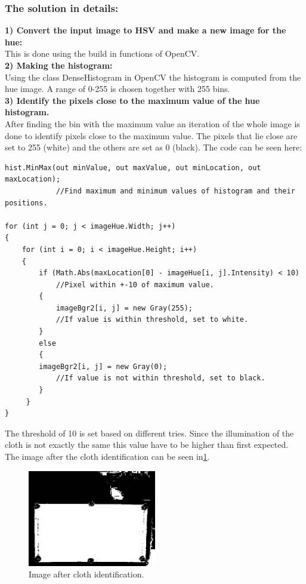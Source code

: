 \subsubsection{The solution in details:}
\textbf{1) Convert the input image to HSV and make a new image for the hue:}\\
This is done using the build in functions of OpenCV\cite{opencv}.\\

\textbf{2) Making the histogram:}\\
Using the class DenseHistogram in OpenCV\cite{opencv} the histogram is computed from the hue image. A range of 0-255 is chosen together with 255 bins.\\

\textbf{3) Identify the pixels close to the maximum value of the hue histogram.}\\
After finding the bin with the maximum value an iteration of the whole image is done to identify pixels close to the maximum value. The pixels that lie close are set to 255 (white) and the others are set as 0 (black). The code can be seen here:\\

\begin{lstlisting}
hist.MinMax(out minValue, out maxValue, out minLocation, out maxLocation); 
			//Find maximum and minimum values of histogram and their positions.

for (int j = 0; j < imageHue.Width; j++)
{
	for (int i = 0; i < imageHue.Height; i++)
	{
		if (Math.Abs(maxLocation[0] - imageHue[i, j].Intensity) < 10) 
			//Pixel within +-10 of maximum value.
		{
			imageBgr2[i, j] = new Gray(255); 
			//If value is within threshold, set to white.
		}
		else 
		{
		imageBgr2[i, j] = new Gray(0); 
			//If value is not within threshold, set to black.
        }
     }
}
\end{lstlisting}

The threshold of 10 is set based on different tries. Since the illumination of the cloth is not exactly the same this value have to be higher than first expected.\\

The image after the cloth identification can be seen in\ref{fig:aftercloth}.

\begin{figure}[H]
\begin{center}
\leavevmode
\includegraphics[width=0.5\textwidth]{images/aftercloth}
\end{center}
\caption{Image after cloth identification.}
\label{fig:aftercloth}
\end{figure}

